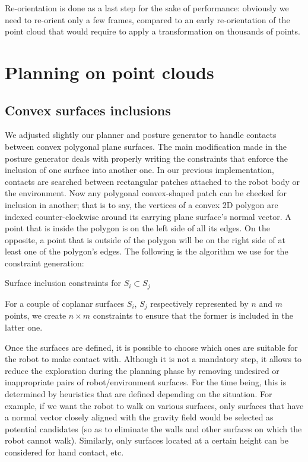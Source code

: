 Re-orientation is done as a last step for the sake of performance: obviously we need to re-orient only a few frames, compared to an early re-orientation of the point cloud that would require to apply a transformation on thousands of points.

\section{Planning on point clouds}
\subsection{Convex surfaces inclusions}
We adjusted slightly our planner and posture generator to handle contacts between convex polygonal plane surfaces. The main modification made in the posture generator deals with properly writing the constraints that enforce the inclusion of one surface into another one. In our previous implementation, contacts are searched between rectangular patches attached to the robot body or the environment. Now any polygonal convex-shaped patch can be checked for inclusion in another; that is to say, the vertices of a convex 2D polygon are indexed counter-clockwise around its carrying plane surface's normal vector. A point that is inside the polygon is on the left side of all its edges. On the opposite, a point that is outside of the polygon will be on the right side of at least one of the polygon's edges. The following is the algorithm we use for the constraint generation:
\begin {algorithm}
\caption{Surface inclusion constraints for $S_i \subset S_j$}
\label{alg1}
\begin{algorithmic}
\ENDFOR
\ENDFOR
\end{algorithmic}
\label{algo:constraints}
\end{algorithm}

For a couple of coplanar surfaces $S_i$, $S_j$ respectively represented by $n$ and $m$ points, we create $n \times m$ constraints to ensure that the former is included in the latter one.

Once the surfaces are defined, it is possible to choose which ones are suitable for the robot to make contact with. Although it is not a mandatory step, it allows to reduce the exploration during the planning phase by removing undesired or inappropriate pairs of robot/environment surfaces. For the time being, this is determined by heuristics that are defined depending on the situation. For example, if we want the robot to walk on various surfaces, only surfaces that have a normal vector closely aligned with the gravity field would be selected as potential candidates (so as to eliminate the walls and other surfaces on which the robot cannot walk). Similarly, only surfaces located at a certain height can be considered for hand contact, etc.

